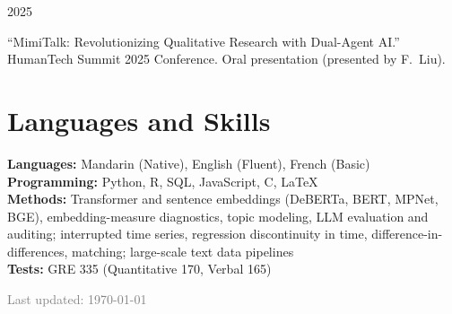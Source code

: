 \documentclass[11pt, a4paper]{article}
\newlength{\datelength}
\newlength{\contentlength}
\newcommand{\cventry}[2]{%
  \noindent
  \begin{minipage}[t]{\datelength}
    \raggedright #1
  \end{minipage}%
  \hspace{0.4cm}%
  \begin{minipage}[t]{\contentlength}
    \raggedright #2
  \end{minipage}%
  \par\vspace{6pt}%
}
\begin{document}
\cventry{2025}{%
  ``MimiTalk: Revolutionizing Qualitative Research with Dual-Agent AI.''\\
  HumanTech Summit 2025 Conference. Oral presentation (presented by F.\ Liu).}

\section{Languages and Skills}

\textbf{Languages:} Mandarin (Native), English (Fluent), French (Basic)\\
\textbf{Programming:} Python, R, SQL, JavaScript, C, \LaTeX\\
\textbf{Methods:} Transformer and sentence embeddings (DeBERTa, BERT, MPNet, BGE), embedding-measure diagnostics, topic modeling, LLM evaluation and auditing; interrupted time series, regression discontinuity in time, difference-in-differences, matching; large-scale text data pipelines\\
\textbf{Tests:} GRE 335 (Quantitative 170, Verbal 165)

\vfill
\begin{center}
  \footnotesize\textcolor{gray}{Last updated: \today}
\end{center}
\end{document}

